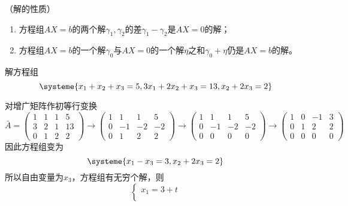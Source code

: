 \begin{theorem}
    （解的性质）
    \begin{enumerate}[(1)]
        \item 方程组$AX=b$的两个解$\gamma_1,\gamma_2$的差$\gamma_1 - \gamma_2$是$AX=0$的解；
        \item 方程组$AX=b$的一个解$\gamma_0$与$AX=0$的一个解$\eta$之和$\gamma_0+\eta$仍是$AX=b$的解。
    \end{enumerate}
\end{theorem}

\begin{example}
    解方程组
    \[
        \systeme{
            x_1 +  x_2 +  x_3 = 5,
            3x_1 + 2x_2 +  x_3 = 13,
            x_2 + 2x_3 =2
        }
    \]
\end{example}
\begin{solution}
    对增广矩阵作初等行变换
    \[
        \bar{A}
        =
        \left(\begin{array}{ccc|c}
                1 & 1 & 1 & 5  \\
                3 & 2 & 1 & 13 \\
                0 & 1 & 2 & 2
            \end{array}\right)
        \longrightarrow
        \left(\begin{array}{ccc|c}
                1 & 1  & 1  & 5  \\
                0 & -1 & -2 & -2 \\
                0 & 1  & 2  & 2
            \end{array}\right)
        \longrightarrow
        \left(\begin{array}{ccc|c}
                1 & 1  & 1  & 5  \\
                0 & -1 & -2 & -2 \\
                0 & 0  & 0  & 0
            \end{array}\right)
        \longrightarrow
        \left(\begin{array}{ccc|c}
                1 & 0 & -1 & 3 \\
                0 & 1 & 2  & 2 \\
                0 & 0 & 0  & 0
            \end{array}\right)
    \]
    因此方程组变为
    \[
        \systeme{
            x_1 - x_3 = 3,
            x_2 + 2x_3 = 2
        }
    \]
    所以自由变量为$x_3$，方程组有无穷个解，则
    \[
        \begin{cases}
            x_1 = 3+t  \\

\end{cases}\]
\end{solution}
